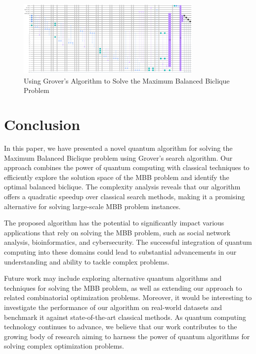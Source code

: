 \begin{figure}[htp]
    \centering
    \includegraphics[width=9cm]{Figures/Maximum_Balanced_Biclique_circuit.png}
    \caption{Using Grover's Algorithm to Solve the Maximum Balanced Biclique Problem}
    \label{fig:Maximum_Balanced_Biclique}
\end{figure}

\section{Conclusion}
\label{sec:conclusion}

In this paper, we have presented a novel quantum algorithm for solving the Maximum Balanced Biclique problem using Grover's search algorithm. Our approach combines the power of quantum computing with classical techniques to efficiently explore the solution space of the MBB problem and identify the optimal balanced biclique. The complexity analysis reveals that our algorithm offers a quadratic speedup over classical search methods, making it a promising alternative for solving large-scale MBB problem instances.

The proposed algorithm has the potential to significantly impact various applications that rely on solving the MBB problem, such as social network analysis, bioinformatics, and cybersecurity. The successful integration of quantum computing into these domains could lead to substantial advancements in our understanding and ability to tackle complex problems.

Future work may include exploring alternative quantum algorithms and techniques for solving the MBB problem, as well as extending our approach to related combinatorial optimization problems. Moreover, it would be interesting to investigate the performance of our algorithm on real-world datasets and benchmark it against state-of-the-art classical methods. As quantum computing technology continues to advance, we believe that our work contributes to the growing body of research aiming to harness the power of quantum algorithms for solving complex optimization problems.

